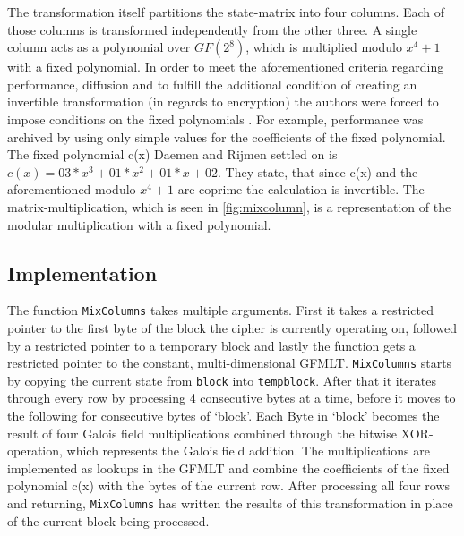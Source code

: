 The transformation itself partitions the
state-matrix into four columns. Each of those columns is transformed
independently from the other three. A single column acts as a polynomial
over $GF(2^{8})$, which is multiplied modulo $x^4 + 1$ with a fixed polynomial. In
order to meet the aforementioned criteria regarding performance,
diffusion and to fulfill the additional condition of creating an
invertible transformation (in regards to encryption) the authors were
forced to impose conditions on the fixed polynomials \cite[p. 39]{rijndael}. For
example, performance was archived by using only simple values for the
coefficients of the fixed polynomial. The fixed polynomial c(x) Daemen
and Rijmen settled on is $c(x) = 03 * x^3 + 01 * x^2 + 01 * x + 02$. They
state, that since c(x) and the aforementioned modulo $x^4+1$ are coprime
the calculation is invertible. The matrix-multiplication, which is seen
in \ref{fig:mixcolumn}, is a representation of the modular multiplication with a
fixed polynomial.

\hypertarget{implementation-4}{%
\subsection{Implementation}\label{implementation-4}}

The function \lstinline|MixColumns| takes multiple arguments. First it takes a
restricted pointer to the first byte of the block the cipher is
currently operating on, followed by a restricted pointer to a temporary
block and lastly the function gets a restricted pointer to the constant,
multi-dimensional GFMLT. \lstinline|MixColumns| starts by copying the current state
from \lstinline|block| into \lstinline|tempblock|. After that it iterates through every row
by processing 4 consecutive bytes at a time, before it moves to the
following for consecutive bytes of `block'. Each Byte in `block' becomes
the result of four Galois field multiplications combined through the
bitwise XOR-operation, which represents the Galois field addition. The
multiplications are implemented as lookups in the GFMLT and combine the
coefficients of the fixed polynomial c(x) with the bytes of the current
row. After processing all four rows and returning, \lstinline|MixColumns| has
written the results of this transformation in place of the current block
being processed.

